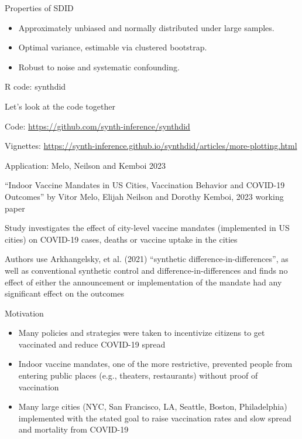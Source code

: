 \documentclass{beamer}
\begin{document}
\begin{frame}{Properties of SDID}
\begin{itemize}
\item Approximately unbiased and normally distributed under large samples.
\item Optimal variance, estimable via clustered bootstrap.
\item Robust to noise and systematic confounding.
\end{itemize}
\end{frame}






\begin{frame}{R code: synthdid}

Let's look at the code together

\bigskip

Code: \url{https://github.com/synth-inference/synthdid} 

\bigskip

Vignettes: \url{https://synth-inference.github.io/synthdid/articles/more-plotting.html}

\end{frame}



\begin{frame}{Application: Melo, Neilson and Kemboi 2023}


``Indoor Vaccine Mandates in US Cities, Vaccination Behavior and COVID-19 Outcomes'' by Vitor Melo, Elijah Neilson and Dorothy Kemboi, 2023 working paper

\bigskip

Study investigates the effect of city-level vaccine mandates (implemented in US cities) on COVID-19 cases, deaths or vaccine uptake in the cities

\bigskip

Authors use Arkhangelsky, et al. (2021) ``synthetic difference-in-differences'', as well as conventional synthetic control and difference-in-differences and finds no effect of either the announcement or implementation of the mandate had any significant effect on the outcomes

\end{frame}

\begin{frame}{Motivation}

\begin{itemize}
\item Many policies and strategies were taken to incentivize citizens to get vaccinated and reduce COVID-19 spread
\item Indoor vaccine mandates, one of the more restrictive, prevented people from entering public places (e.g., theaters, restaurants) without proof of vaccination
\item Many large cities (NYC, San Francisco, LA, Seattle, Boston, Philadelphia) implemented with the stated goal to raise vaccination rates and slow spread and mortality from COVID-19
\end{itemize}

\end{frame}
\end{document}

